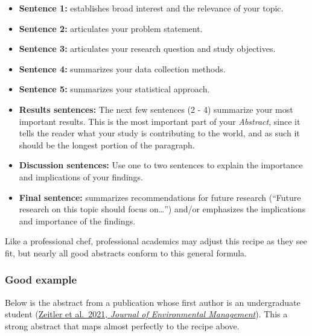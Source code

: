 \documentclass[]{book}
\providecommand{\tightlist}{%
  \setlength{\itemsep}{0pt}\setlength{\parskip}{0pt}}
\begin{document}
\begin{itemize}
\tightlist
\item
  \textbf{Sentence 1:} establishes broad interest and the relevance of your topic.\\
\item
  \textbf{Sentence 2:} articulates your problem statement.\\
\item
  \textbf{Sentence 3:} articulates your research question and study objectives.\\
\item
  \textbf{Sentence 4:} summarizes your data collection methods.\\
\item
  \textbf{Sentence 5:} summarizes your statistical approach.\\
\item
  \textbf{Results sentences:} The next few sentences (2 - 4) summarize your most important results. This is the most important part of your \emph{Abstract}, since it tells the reader what your study is contributing to the world, and as such it should be the longest portion of the paragraph.
\item
  \textbf{Discussion sentences:} Use one to two sentences to explain the importance and implications of your findings.\\
\item
  \textbf{Final sentence:} summarizes recommendations for future research (``Future research on this topic should focus on\ldots{}'') and/or emphasizes the implications and importance of the findings.
\end{itemize}

Like a professional chef, professional academics may adjust this recipe as they see fit, but nearly all good abstracts conform to this general formula.

\hypertarget{good-example}{%
\subsubsection*{Good example}\label{good-example}}

Below is the abstract from a publication whose first author is an undergraduate student (\href{https://www.sciencedirect.com/science/article/pii/S0301479721006332?casa_token=BhsD4GiVQhIAAAAA:78wrLH-vN5gUPvNdX16fyaoHJq8QVQpQ-mqVA6UqxpxLMOFKweuX0YwJtBMLMnmVnfU4e1k}{Zeitler et al.~2021, \emph{Journal of Environmental Management}}). This a strong abstract that maps almost perfectly to the recipe above.
\end{document}
